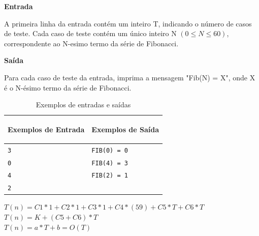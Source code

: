 \vspace{0.3cm}
\textbf{Entrada}

A primeira linha da entrada contém um inteiro T, indicando o número de casos de teste. Cada caso de teste contém um único inteiro N $(0 \leq N \leq 60)$, correspondente ao N-esimo termo da série de Fibonacci.

\vspace{0.3cm}
\textbf{Saída}

Para cada caso de teste da entrada, imprima a mensagem "Fib(N) = X", onde X é o N-ésimo termo da série de Fibonacci.


\begin{table}[!ht]
    \centering
    \begin{tabular}{|p{7cm}|p{7cm}|}
        \hline
        \begin{center}
            \vspace{-0.3cm}
            \textbf{Exemplos de Entrada}
            \vspace{-0.3cm}
        \end{center} 
         &  
        \begin{center}
            \vspace{-0.3cm}
            \textbf{Exemplos de Saída}
            \vspace{-0.3cm}
        \end{center} \\ \hline
         \texttt{3} & \texttt{FIB(0) = 0} \\
         \texttt{0} & \texttt{FIB(4) = 3} \\
         \texttt{4} & \texttt{FIB(2) = 1} \\
         \texttt{2} & \texttt{}\\
         \hline
    \end{tabular}
    \caption{Exemplos de entradas e saídas}
    \label{tabela04}
\end{table}


\begin{center}
\begin{minipage}{0.5\textwidth}
    
\end{minipage}
\end{center}
$T(n)=C1*1+C2*1+C3*1+C4*(59)+C5*T+C6*T$\\
$T(n)=K+(C5+C6)*T$\\
$T(n)=a*T+b=O(T)$
